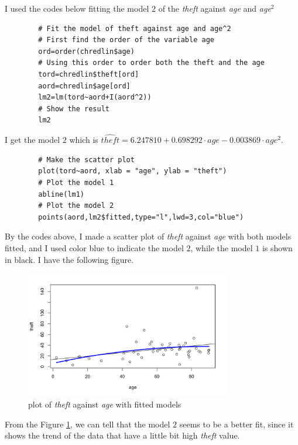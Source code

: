 \begin{answer}
    I used the codes below fitting the model $2$ of the \textit{theft} against \textit{age} and \textit{age${}^2$}
    \begin{verbatim}
        # Fit the model of theft against age and age^2
        # First find the order of the variable age
        ord=order(chredlin$age)
        # Using this order to order both the theft and the age
        tord=chredlin$theft[ord]
        aord=chredlin$age[ord]
        lm2=lm(tord~aord+I(aord^2))
        # Show the result
        lm2
    \end{verbatim}
    I get the model $2$ which is $\widehat{theft} = 6.247810 + 0.698292 \cdot age - 0.003869 \cdot {age}^2$.
    \begin{verbatim}
        # Make the scatter plot
        plot(tord~aord, xlab = "age", ylab = "theft")
        # Plot the model 1
        abline(lm1)
        # Plot the model 2
        points(aord,lm2$fitted,type="l",lwd=3,col="blue")
    \end{verbatim}
    By the codes above, I made a scatter plot of \textit{theft} against \textit{age} with both models fitted, and I used color blue to indicate the model $2$, while the model $1$ is shown in black. I have the following figure.
    \begin{figure}[H]
        \centering
        \includegraphics[width=0.8\textwidth]{Figure 3.png}
        \caption{\label{fig:fig3}plot of \textit{theft} against \textit{age} with fitted models}
    \end{figure}
    From the Figure \ref{fig:fig3}, we can tell that the model $2$ seems to be a better fit, since it shows the trend of the data that have a little bit high \textit{theft} value.
\end{answer}
